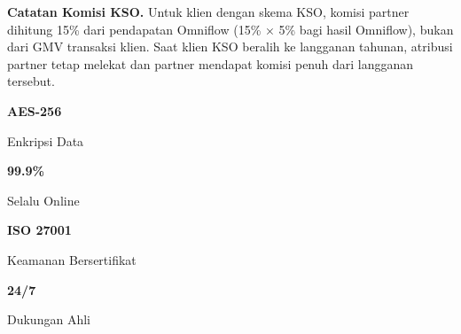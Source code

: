 \documentclass[a4paper]{article}
\begin{document}
\vspace{8pt}

{\setlength{\fboxsep}{8pt}\setlength{\fboxrule}{0pt}%
\noindent\colorbox{EmeraldBg}{%
    \begin{minipage}{\dimexpr\textwidth-2\fboxsep\relax}
        {\fontsize{9}{12}\selectfont\bfseries\color{EmeraldDark} Catatan Komisi KSO.}\enspace
        {\fontsize{9}{12}\selectfont\color{TextDark}%
        Untuk klien dengan skema KSO, komisi partner dihitung 15\% dari pendapatan Omniflow (15\% × 5\% bagi hasil Omniflow), bukan dari GMV transaksi klien. Saat klien KSO beralih ke langganan tahunan, atribusi partner tetap melekat dan partner mendapat komisi penuh dari langganan tersebut.}
    \end{minipage}}}

\vspace{8pt}

\noindent
\colorbox{BluePrimary}{%
\begin{minipage}{\dimexpr\textwidth-2\fboxsep}
\hspace{6pt}%
\begin{minipage}[t][1.25cm][c]{0.24\linewidth}
    \begin{center}
        {\fontsize{18}{22}\selectfont\bfseries\color{White} AES-256}\par
        {\fontsize{8}{10}\selectfont\color{BlueMid} Enkripsi Data}
    \end{center}
\end{minipage}%
\hfill
\begin{minipage}[t][1.25cm][c]{0.24\linewidth}
    \begin{center}
        {\fontsize{18}{22}\selectfont\bfseries\color{White} 99.9\%}\par
        {\fontsize{8}{10}\selectfont\color{BlueMid} Selalu Online}
    \end{center}
\end{minipage}%
\hfill
\begin{minipage}[t][1.25cm][c]{0.24\linewidth}
    \begin{center}
        {\fontsize{18}{22}\selectfont\bfseries\color{White} ISO 27001}\par
        {\fontsize{8}{10}\selectfont\color{BlueMid} Keamanan Bersertifikat}
    \end{center}
\end{minipage}%
\hfill
\begin{minipage}[t][1.25cm][c]{0.24\linewidth}
    \begin{center}
        {\fontsize{18}{22}\selectfont\bfseries\color{White} 24/7}\par
        {\fontsize{8}{10}\selectfont\color{BlueMid} Dukungan Ahli}
    \end{center}
\end{minipage}%
\hspace{6pt}%
\end{minipage}}
\end{document}
